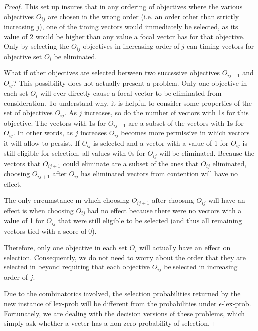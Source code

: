 \documentclass[sigconf]{acmart}
\begin{document}
\begin{proof}
This set up insures that in any ordering of objectives where the various objectives $O_{ij}$ are chosen in the wrong order (i.e. an order other than strictly increasing $j$), one of the timing vectors would immediately be selected, as its value of 2 would be higher than any value a focal vector has for that objective. Only by selecting the $O_{ij}$ objectives in increasing order of $j$ can timing vectors for objective set $O_i$ be eliminated.

What if other objectives are selected between two successive objectives $O_{ij-1}$ and $O_{ij}$? This possibility does not actually present a problem. Only one objective in each set $O_{i}$ will ever directly cause a focal vector to be eliminated from consideration. To understand why, it is helpful to consider some properties of the set of objectives $O_{ij}$. As $j$ increases, so do the number of vectors with 1s for this objective. The vectors with 1s for $O_{ij-1}$ are a subset of the vectors with 1s for $O_{ij}$. In other words, as $j$ increases $O_{ij}$ becomes more permissive in which vectors it will allow to persist. If $O_{ij}$ is selected and a vector with a value of 1 for $O_{ij}$ is still eligible for selection, all values with 0s for $O_{ij}$ will be eliminated. Because the vectors that $O_{ij+1}$ could eliminate are a subset of the ones that $O_{ij}$ eliminated, choosing $O_{ij+1}$ after $O_{ij}$ has eliminated vectors from contention will have no effect. 

The only circumstance in which choosing $O_{ij+1}$ after choosing $O_{ij}$ will have an effect is when choosing $O_{ij}$ had no effect because there were no vectors with a value of 1 for $O_{ij}$ that were still eligible to be selected (and thus all remaining vectors tied with a score of 0).

Therefore, only one objective in each set $O_i$ will actually have an effect on selection. Consequently, we do not need to worry about the order that they are selected in beyond requiring that each objective $O_{ij}$ be selected in increasing order of $j$.

Due to the combinatorics involved, the selection probabilities returned by the new instance of {\sc lex-prob} will be different from the probabilities under {\sc $\epsilon$-lex-prob}. Fortunately, we are dealing with the decision versions of these problems, which simply ask whether a vector has a non-zero probability of selection.

\end{proof}
\end{document}
